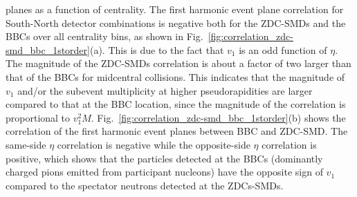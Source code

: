 \documentclass[aps,prc,superscriptaddress,showpacs,floatfix,twocolumn]{revtex4}
\newcommand \Fig{Fig.\xspace}
\begin{document}
planes as a function of centrality. The first harmonic event plane correlation for South-North 
detector combinations is negative both for the ZDC-SMDs and the BBCs over all centrality bins, 
as shown in \Fig~\ref{fig:correlation_zdc-smd_bbc_1storder}(a). 
This is due to the fact that $v_1$ 
is an odd function of $\eta$. The magnitude of the ZDC-SMDs correlation is about a factor of two 
larger than that of the BBCs for midcentral collisions.  This indicates that the magnitude of $v_1$ 
and/or the subevent multiplicity at higher pseudorapidities are larger compared to that at the BBC 
location, since the magnitude of the correlation is proportional to $v_1^2M$. 
Fig.~\ref{fig:correlation_zdc-smd_bbc_1storder}(b) shows the 
correlation of the first harmonic event 
planes between BBC and ZDC-SMD. The same-side $\eta$ correlation is negative while the 
opposite-side $\eta$ correlation is positive, which shows that the particles detected at the BBCs 
(dominantly charged pions emitted from participant nucleons) have the opposite sign of $v_1$ 
compared to the spectator neutrons detected at the ZDCs-SMDs. 

\end{document}
